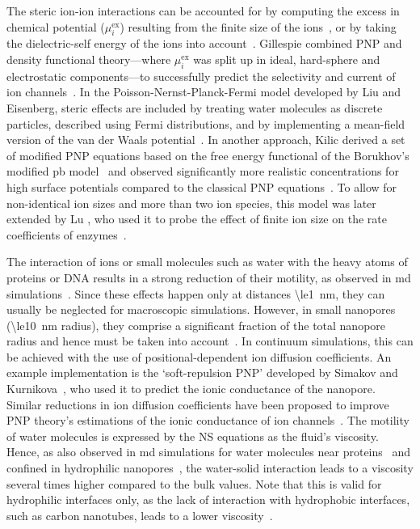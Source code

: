 The steric ion-ion interactions can be accounted for by computing the excess in chemical potential
($\mu_{i}^\text{ex}$) resulting from the finite size of the ions~\cite{Eisenberg-1996,Bazant-2009,
Daiguji-2010}, or by taking the dielectric-self energy of the ions into account~\cite{Corry-2003,
Bonthuis-2006}. Gillespie \etal{} combined PNP and density functional theory---where $\mu_{i}^\text{ex}$ was
split up in ideal, hard-sphere and electrostatic components---to successfully predict the selectivity and
current of ion channels~\cite{Gillespie-2002}. In the Poisson-Nernst-Planck-Fermi model developed by Liu and
Eisenberg, steric effects are included by treating water molecules as discrete particles, described using
Fermi distributions, and by implementing a mean-field version of the van der Waals
potential~\cite{Liu-2013,Liu-2015,Liu-2020}. In another approach, Kilic \etal{} derived a set of modified PNP
equations based on the free energy functional of the Borukhov's modified \gls{pb} model~\cite{Borukhov-1997}
and observed significantly more realistic concentrations for high surface potentials compared to the classical
PNP equations~\cite{Kilic-2007}. To allow for non-identical ion sizes and more than two ion species, this
model was later extended by Lu \etal{}, who used it to probe the effect of finite ion size on the rate
coefficients of enzymes~\cite{Lu-2011}.

The interaction of ions or small molecules such as water with the heavy atoms of proteins or DNA results in a
strong reduction of their motility, as observed in \gls{md}
simulations~\cite{Makarov-1998,Pronk-2014,Wilson-2019}. Since these effects happen only at distances
\SI{\le1}{\nm}, they can usually be neglected for macroscopic simulations. However, in small nanopores
(\SI{\le10}{\nm} radius), they comprise a significant fraction of the total nanopore radius and hence must be
taken into account~\cite{Noskov-2004,Simakov-2010,Pederson-2015, McMullen-2017}. In continuum simulations,
this can be achieved with the use of positional-dependent ion diffusion coefficients. An example
implementation is the `soft-repulsion PNP' developed by Simakov and
Kurnikova~\cite{Simakov-2010,Simakov-2018}, who used it to predict the ionic conductance of the 
nanopore. Similar reductions in ion diffusion coefficients have been proposed to improve PNP theory's
estimations of the ionic conductance of ion channels~\cite{Furini-2006,Liu-2015, DeBiase-2015}. The motility
of water molecules is expressed by the NS equations as the fluid's viscosity. Hence, as also observed in
\gls{md} simulations for water molecules near proteins~\cite{Pronk-2014} and confined in hydrophilic
nanopores~\cite{Qiao-Aluru-2003,Vo-2016,Hsu-2017}, the water-solid interaction leads to a viscosity several
times higher compared to the bulk values. Note that this is valid for hydrophilic interfaces only, as the lack
of interaction with hydrophobic interfaces, such as carbon nanotubes, leads to a lower
viscosity~\cite{Ye-2011}.

